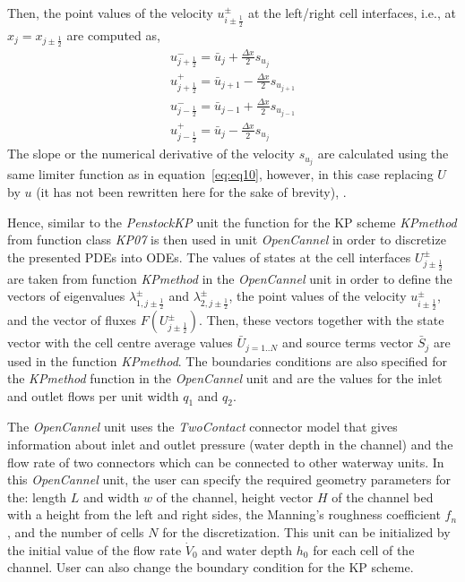 \documentclass[%
]{USN-PhD}
\begin{document}
Then, the point values of the velocity $u_{i\pm\frac{1}{2}}^\pm$ at the left/right cell interfaces, i.e., at $x_j = x_{j\pm\frac{1}{2}}$ are computed as, \cite{Sha:15}
\begin{equation}\label{eq:eq19}
\begin{array}{c}
u^-_{j+\frac{1}{2}}=\bar{u}_j+\frac{\Delta x}{2}s_{u_j}\\
u^+_{j+\frac{1}{2}}=\bar{u}_{j+1}-\frac{\Delta x}{2}s_{u_{j+1}}\\
u^-_{j-\frac{1}{2}}=\bar{u}_{j-1}+\frac{\Delta x}{2}s_{u_{j-1}}\\
u^+_{j-\frac{1}{2}}=\bar{u}_j-\frac{\Delta x}{2}s_{u_j}
\end{array}
\end{equation}
The slope or the numerical derivative of the velocity	$s_{u_j}$ are calculated using the same limiter function as in equation~\ref{eq:eq10}, however, in this case replacing $U$ by $u$ (it has not been rewritten here for the sake of brevity), \cite{Sha:15}.

Hence, similar to the \emph{PenstockKP} unit the function for the KP scheme \emph{KPmethod} from function class \emph{KP07} is then used in unit \emph{OpenCannel} in order to discretize the presented PDEs into ODEs. The values of states at the cell interfaces $U^\pm_{j\pm\frac{1}{2}}$ are taken from function \emph{KPmethod} in the \emph{OpenCannel} unit in order to define the vectors of eigenvalues $\lambda^\pm_{1,j\pm\frac{1}{2}}$ and $\lambda^\pm_{2,j\pm\frac{1}{2}}$,  the point values of the velocity $u_{i\pm\frac{1}{2}}^\pm$, and the vector of fluxes $F\left(U^\pm_{j\pm\frac{1}{2}}\right)$. Then, these vectors together with the state vector with the cell centre average values $\bar{U}_{j=1..N}$ and source terms vector $\bar{S}_j$ are used in the function \emph{KPmethod}. The boundaries conditions are also specified for the \emph{KPmethod} function in the \emph{OpenCannel} unit and are the values for the inlet and outlet flows per unit width $q_\mathrm{1}$ and $q_\mathrm{2}$.

The \emph{OpenCannel} unit uses the \emph{TwoContact} connector model that gives information about inlet and outlet pressure (water depth in the channel) and the flow rate of two connectors which can be connected to other waterway units. In this \emph{OpenCannel} unit, the user can specify the required geometry parameters for the: length $L$ and width $w$ of the channel, height vector $H$ of the channel bed with a height from the left and right sides, the Manning's roughness coefficient $f_n$, and the number of cells $N$ for the discretization. This unit can be initialized by the initial value of the flow rate $\dot{V}_\mathrm{0}$ and water depth $h_\mathrm{0}$ for each cell of the channel. User can also change the boundary condition for the KP scheme.
\end{document}
